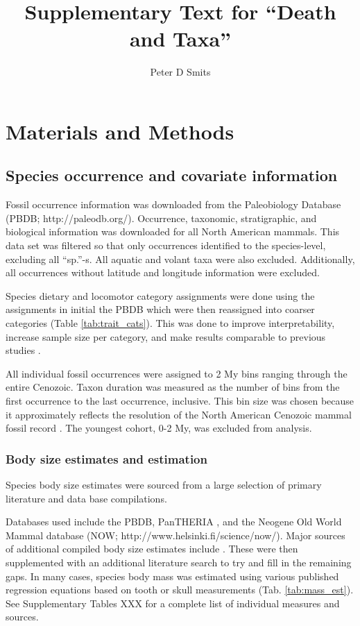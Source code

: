 \documentclass{article}
\title{Supplementary Text for ``Death and Taxa''}
\author{Peter D Smits}
\begin{document}
\maketitle
\linenumbers
\modulolinenumbers[2]

\section{Materials and Methods}

\subsection{Species occurrence and covariate information}
Fossil occurrence information was downloaded from the Paleobiology Database (PBDB; http://paleodb.org/). Occurrence, taxonomic, stratigraphic, and biological information was downloaded for all North American mammals. This data set was filtered so that only occurrences identified to the species-level, excluding all ``sp.''-s. All aquatic and volant taxa were also excluded. Additionally, all occurrences without latitude and longitude information were excluded.

Species dietary and locomotor category assignments were done using the assignments in initial the PBDB which were then reassigned into coarser categories (Table \ref{tab:trait_cats}). This was done to improve interpretability, increase sample size per category, and make results comparable to previous studies \cite{Jernvall2004,Price2012}.

All individual fossil occurrences were assigned to 2 My bins ranging through the entire Cenozoic. Taxon duration was measured as the number of bins from the first occurrence to the last occurrence, inclusive. This bin size was chosen because it approximately reflects the resolution of the North American Cenozoic mammal fossil record \cite{Alroy2009,Alroy2000g,Marcot2014}. The youngest cohort, 0-2 My, was excluded from analysis.


\subsubsection{Body size estimates and estimation}
Species body size estimates were sourced from a large selection of primary literature and data base compilations.

Databases used include the PBDB, PanTHERIA \cite{Jones2009c}, and the Neogene Old World Mammal database (NOW; http://www.helsinki.fi/science/now/). Major sources of additional compiled body size estimates include \cite{Brook2004a,Freudenthal2013,McKenna2011,Raia2012f,Smith2004c,Tomiya2013}. These were then supplemented with an additional literature search to try and fill in the remaining gaps. In many cases, species body mass was estimated using various published regression equations based on tooth or skull measurements (Tab. \ref{tab:mass_est}). See Supplementary Tables XXX for a complete list of individual measures and sources.
\end{document}
